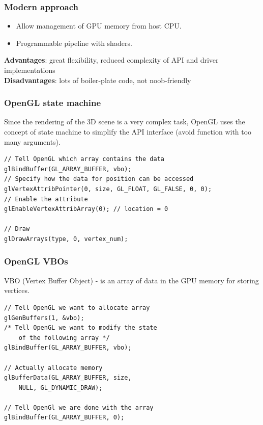 \begin{frame}[fragile]

\frametitle{Modern approach}

\begin{itemize}
    \item{Allow management of GPU memory from host CPU.}
    \item{Programmable pipeline with shaders.}
\end{itemize}

\vspace{5mm}
\textbf{Advantages}: great flexibility, reduced complexity of API and driver implementations
\newline
\\
\textbf{Disadvantages}: lots of boiler-plate code, not noob-friendly

\end{frame}


\begin{frame}[fragile]

\frametitle{OpenGL state machine}

Since the rendering of the 3D scene is a very complex task, OpenGL uses
the concept of state machine to simplify the API interface (avoid function
with too many arguments).

\begin{center}
\begin{lstlisting}
// Tell OpenGL which array contains the data
glBindBuffer(GL_ARRAY_BUFFER, vbo);
// Specify how the data for position can be accessed
glVertexAttribPointer(0, size, GL_FLOAT, GL_FALSE, 0, 0);
// Enable the attribute
glEnableVertexAttribArray(0); // location = 0

// Draw
glDrawArrays(type, 0, vertex_num);
\end{lstlisting}
\end{center}

\end{frame}


\begin{frame}[fragile]

\frametitle{OpenGL VBOs}

VBO (Vertex Buffer Object) - is an array of data in the GPU memory for storing vertices.

\vspace{5mm}

\begin{lstlisting}
// Tell OpenGL we want to allocate array
glGenBuffers(1, &vbo);
/* Tell OpenGL we want to modify the state
    of the following array */
glBindBuffer(GL_ARRAY_BUFFER, vbo);

// Actually allocate memory
glBufferData(GL_ARRAY_BUFFER, size,
    NULL, GL_DYNAMIC_DRAW);

// Tell OpenGl we are done with the array
glBindBuffer(GL_ARRAY_BUFFER, 0);
\end{lstlisting}

\end{frame}

